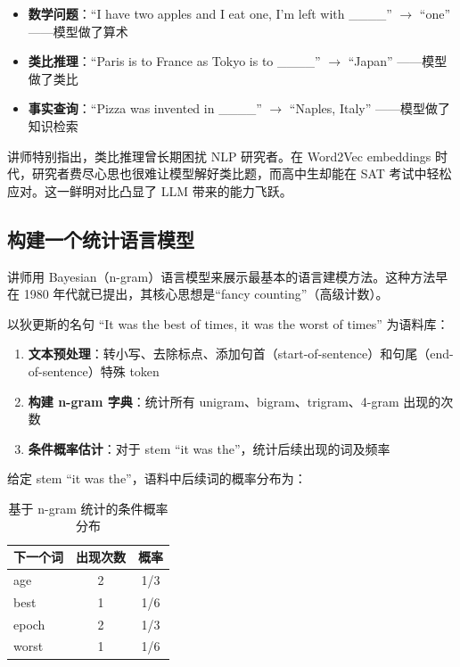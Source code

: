 \documentclass[a4paper]{article}
\begin{document}
\begin{itemize}
    \item \textbf{数学问题}：``I have two apples and I eat one, I'm left with \_\_\_\_'' $\rightarrow$ ``one'' ——模型做了算术
    \item \textbf{类比推理}：``Paris is to France as Tokyo is to \_\_\_\_'' $\rightarrow$ ``Japan'' ——模型做了类比
    \item \textbf{事实查询}：``Pizza was invented in \_\_\_\_'' $\rightarrow$ ``Naples, Italy'' ——模型做了知识检索
\end{itemize}

讲师特别指出，类比推理曾长期困扰 NLP 研究者。在 Word2Vec embeddings 时代，研究者费尽心思也很难让模型解好类比题，而高中生却能在 SAT 考试中轻松应对。这一鲜明对比凸显了 LLM 带来的能力飞跃。

\subsection{构建一个统计语言模型}

讲师用 Bayesian（n-gram）语言模型来展示最基本的语言建模方法。这种方法早在 1980 年代就已提出，其核心思想是``fancy counting''（高级计数）。

以狄更斯的名句 ``It was the best of times, it was the worst of times'' 为语料库：

\begin{enumerate}
    \item \textbf{文本预处理}：转小写、去除标点、添加句首（start-of-sentence）和句尾（end-of-sentence）特殊 token
    \item \textbf{构建 n-gram 字典}：统计所有 unigram、bigram、trigram、4-gram 出现的次数
    \item \textbf{条件概率估计}：对于 stem ``it was the''，统计后续出现的词及频率
\end{enumerate}

给定 stem ``it was the''，语料中后续词的概率分布为：

\begin{table}[H]
\centering
\begin{tabular}{lcc}
\toprule
\textbf{下一个词} & \textbf{出现次数} & \textbf{概率} \\
\midrule
age       & 2 & 1/3 \\
best      & 1 & 1/6 \\
epoch     & 2 & 1/3 \\
worst     & 1 & 1/6 \\
\bottomrule
\end{tabular}
\caption{基于 n-gram 统计的条件概率分布}
\end{table}
\end{document}
